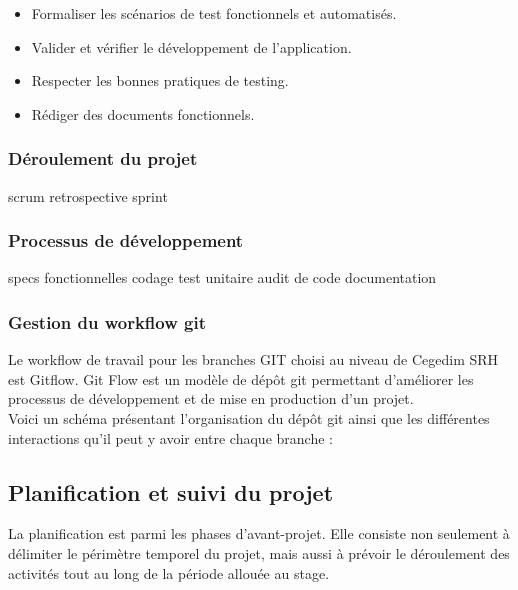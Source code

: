 {\begin{center}
{{            }
            {\footnotesize\raggedright
            \begin{itemize}
                \item Formaliser les scénarios de test fonctionnels et automatisés.
                \item Valider et vérifier le développement de l’application.
                \item Respecter les bonnes pratiques de testing.
                \item Rédiger des documents fonctionnels.\\
            \end{itemize}
        }}
\end{center}    
}
\subsubsection{Déroulement du projet}
scrum
retrospective 
sprint
\subsubsection{Processus de développement}
specs fonctionnelles
codage
test unitaire
audit de code
documentation
\subsubsection{Gestion du workflow git}
Le workflow de travail pour les branches GIT choisi au niveau de Cegedim SRH est Gitflow. Git Flow est un modèle de dépôt git permettant d'améliorer les processus de développement et de mise en production d'un projet.\\
Voici un schéma présentant l'organisation du dépôt git ainsi que les différentes interactions qu'il peut y avoir entre chaque branche :
\subsection{Planification et suivi du projet}
La planification est parmi les phases d'avant-projet. Elle consiste non seulement à délimiter le périmètre temporel du projet, mais aussi à prévoir le déroulement des activités tout au long de la période allouée au stage.

